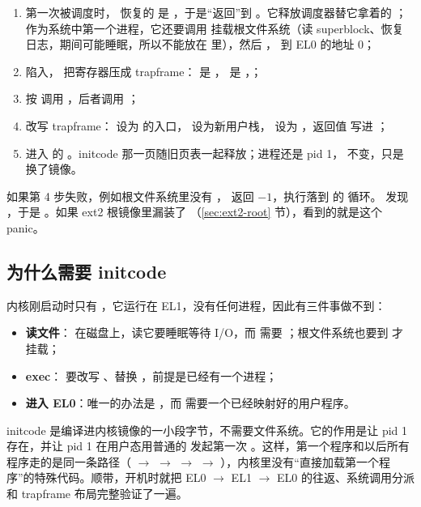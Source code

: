 \begin{enumerate}
  \item 第一次被调度时， 恢复的  是 ，于是“返回”到 。它释放调度器替它拿着的 ；作为系统中第一个进程，它还要调用  挂载根文件系统（读 superblock、恢复日志，期间可能睡眠，所以不能放在  里），然后 ， 到 EL0 的地址 0；
  \item {} 陷入， 把寄存器压成 trapframe： 是 ， 是 ，；
  \item {} 按  调用 ，后者调用 ；
  \item {} 改写 trapframe： 设为  的入口， 设为新用户栈， 设为 ，返回值  写进 ；
  \item {} 进入  的 。initcode 那一页随旧页表一起释放；进程还是 pid 1， 不变，只是换了镜像。
\end{enumerate}

如果第 4 步失败，例如根文件系统里没有 ， 返回 $-1$，执行落到  的  循环。 发现 ，于是 。如果 ext2 根镜像里漏装了 （\ref{sec:ext2-root} 节），看到的就是这个 panic。

\subsection{为什么需要 initcode}

内核刚启动时只有 ，它运行在 EL1，没有任何进程，因此有三件事做不到：

\begin{itemize}
  \item \textbf{读文件}： 在磁盘上，读它要睡眠等待 I/O，而  需要 ；根文件系统也要到  才挂载；
  \item \textbf{exec}： 要改写 、替换 ，前提是已经有一个进程；
  \item \textbf{进入 EL0}：唯一的办法是 ，而  需要一个已经映射好的用户程序。
\end{itemize}

initcode 是编译进内核镜像的一小段字节，不需要文件系统。它的作用是让 pid 1 存在，并让 pid 1 在用户态用普通的  发起第一次 。这样，第一个程序和以后所有程序走的是同一条路径（ $\to$  $\to$  $\to$  $\to$ ），内核里没有“直接加载第一个程序”的特殊代码。顺带，开机时就把 EL0 $\to$ EL1 $\to$ EL0 的往返、系统调用分派和 trapframe 布局完整验证了一遍。

